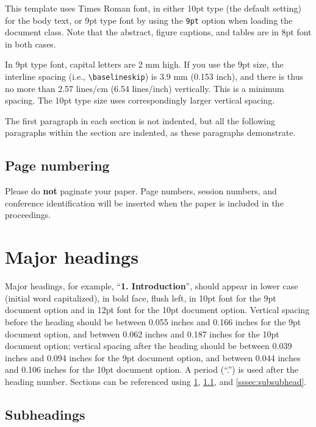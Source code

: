 \documentclass[9pt]{ieeeconf}
\begin{document}
This template uses Times Roman font, in either 10pt type (the default setting) for the body text, or 9pt type font by using the \texttt{9pt} option when loading the document class. Note that the abstract, figure captions, and tables are in 8pt font in both cases.

In 9pt type font, capital letters are 2 mm high. If you use the 9pt size, the interline spacing (i.e., \texttt{\textbackslash{baselineskip}}) is 3.9 mm (0.153 inch), and there is thus no more than 2.57 lines/cm (6.54 lines/inch) vertically. This is a minimum spacing. The 10pt type size uses correspondingly larger vertical spacing.

The first paragraph in each section is not indented, but all the following paragraphs within the section are indented, as these paragraphs demonstrate.

\subsection{Page numbering}
\label{sec:page}

Please do {\bf not} paginate your paper. Page numbers, session numbers, and conference identification will be inserted when the paper is included in the proceedings.


\section{Major headings}
\label{sec:majhead}

Major headings, for example, ``{\bf 1. Introduction}'', should appear in lower case (initial word capitalized), in bold face, flush left, in 10pt font for the 9pt document option and in 12pt font for the 10pt document option. Vertical spacing before the heading should be between 0.055 inches and 0.166 inches for the 9pt document option, and between 0.062 inches and 0.187 inches for the 10pt document option; vertical spacing after the heading should be between 0.039 inches and 0.094 inches for the 9pt document option, and between 0.044 inches and 0.106 inches for the 10pt document option. A period (``.'') is used after the heading number. Sections can be referenced using \cref{sec:majhead}, \cref{ssec:subhead}, and \cref{sssec:subsubhead}.

\subsection{Subheadings}
\label{ssec:subhead}
\end{document}
